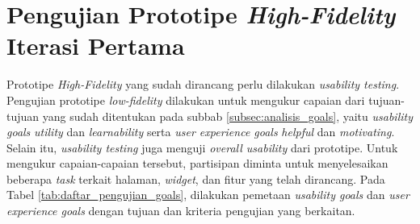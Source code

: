 \section{Pengujian Prototipe \textit{High-Fidelity} Iterasi Pertama}
\label{sec:test_1}

Prototipe \textit{High-Fidelity} yang sudah dirancang perlu dilakukan \textit{usability testing}. Pengujian prototipe \textit{low-fidelity} dilakukan untuk mengukur capaian dari tujuan-tujuan yang sudah ditentukan pada subbab \ref{subsec:analisis_goals}, yaitu \textit{usability goals} \textit{utility} dan \textit{learnability} serta \textit{user experience goals} \textit{helpful} dan \textit{motivating}. Selain itu, \textit{usability testing} juga menguji \textit{overall usability} dari prototipe. Untuk mengukur capaian-capaian tersebut, partisipan diminta untuk menyelesaikan beberapa \textit{task} terkait halaman, \textit{widget}, dan fitur yang telah dirancang. Pada Tabel \ref{tab:daftar_pengujian_goals}, dilakukan pemetaan \textit{usability goals} dan \textit{user experience goals} dengan tujuan dan kriteria pengujian yang berkaitan.

